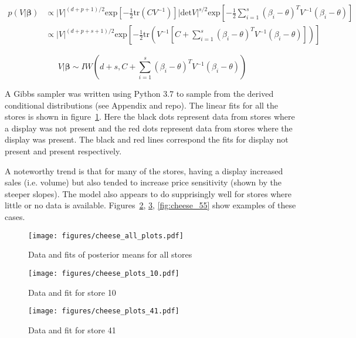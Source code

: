 \documentclass[12pt]{article}
\begin{document}
    \begin{align*}
        p(V|\mathbf{\beta}) &\propto |V|^{(d+p+1)/2} \text{exp}\left[-\frac{1}{2} \text{tr}(C V^{-1}) \right] | \text{det} V |^{s/2} \text{exp}\left[-\frac{1}{2} \sum_{i=1}^s (\beta_i - \theta)^T V^{-1} (\beta_i - \theta) \right] \\
        &\propto |V|^{(d+p+s+1)/2} \text{exp}\left[-\frac{1}{2} \text{tr}\left(V^{-1}\left[C + \sum_{i=1}^s(\beta_i - \theta)^T V^{-1} (\beta_i - \theta) \right]\right) \right]
    \end{align*}

    $$V|\mathbf{\beta} \sim IW\left( d+ s, C + \sum_{i=1}^s(\beta_i - \theta)^T V^{-1} (\beta_i - \theta) \right)$$

    A Gibbs sampler was written using Python 3.7 to sample from the derived conditional distributions (see Appendix and repo). The linear fits for all the stores is shown in figure~\ref{fig:all_cheese}. Here the black dots represent data from stores where a display was not present and the red dots represent data from stores where the display was present. The black and red lines correspond the fits for display not present and present respectively. 

    A noteworthy trend is that for many of the stores, having a display increased sales (i.e. volume) but also tended to increase price sensitivity (shown by the steeper slopes). The model also appears to do supprisingly well for stores where little or no data is available. Figures~\ref{fig:cheese_10}, \ref{fig:cheese_41}, \ref{fig:cheese_55} show examples of these cases.

    \begin{figure}[ht] 
      \centering 
      \texttt{[image: figures/cheese\_all\_plots.pdf]}
      \vskip-10pt
      \caption{\label{fig:all_cheese}Data and fits of posterior means for all stores}
    \end{figure}

    \begin{figure}[ht] 
      \centering 
      \texttt{[image: figures/cheese\_plots\_10.pdf]}
      \vskip-10pt
      \caption{\label{fig:cheese_10} Data and fit for store 10}
    \end{figure}

    \begin{figure}[ht] 
      \centering 
      \texttt{[image: figures/cheese\_plots\_41.pdf]}
      \vskip-10pt
      \caption{\label{fig:cheese_41} Data and fit for store 41}
    \end{figure}
\end{document}
